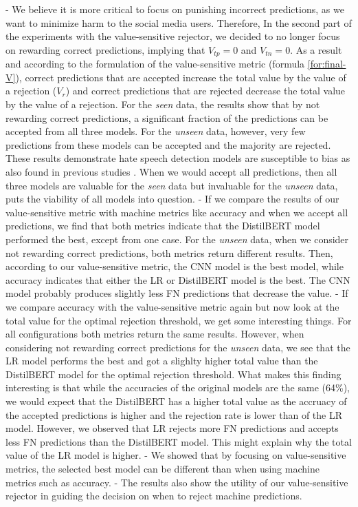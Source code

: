 - We believe it is more critical to focus on punishing incorrect predictions, as we want to minimize harm to the social media users. Therefore, In the second part of the experiments with the value-sensitive rejector, we decided to no longer focus on rewarding correct predictions, implying that $V_{tp}=0$ and $V_{tn}=0$. As a result and according to the formulation of the value-sensitive metric (formula \ref{for:final-V}), correct predictions that are accepted increase the total value by the value of a rejection ($V_r$) and correct predictions that are rejected decrease the total value by the value of a rejection. For the \emph{seen} data, the results show that by not rewarding correct predictions, a significant fraction of the predictions can be accepted from all three models. For the \emph{unseen} data, however, very few predictions from these models can be accepted and the majority are rejected. These results demonstrate hate speech detection models are susceptible to bias as also found in previous studies \citep{arango2019hate,grondahl2018all}. When we would accept all predictions, then all three models are valuable for the \emph{seen} data but invaluable for the \emph{unseen} data, puts the viability of all models into question.
- If we compare the results of our value-sensitive metric with machine metrics like accuracy and when we accept all predictions, we find that both metrics indicate that the DistilBERT model performed the best, except from one case. For the \emph{unseen} data, when we consider not rewarding correct predictions, both metrics return different results. Then, according to our value-sensitive metric, the CNN model is the best model, while accuracy indicates that either the LR or DistilBERT model is the best. The CNN model probably produces slightly less FN predictions that decrease the value.
- If we compare accuracy with the value-sensitive metric again but now look at the total value for the optimal rejection threshold, we get some interesting things. For all configurations both metrics return the same results. However, when considering not rewarding correct predictions for the \emph{unseen} data, we see that the LR model performs the best and got a slighlty higher total value than the DistilBERT model for the optimal rejection threshold. What makes this finding interesting is that while the accuracies of the original models are the same  (64\%), we would expect that the DistilBERT has a higher total value as the accruacy of the accepted predictions is higher and the rejection rate is lower than of the LR model. However, we observed that LR rejects more FN predictions and accepts less FN predictions than the DistilBERT model. This might explain why the total value of the LR model is higher.
- We showed that by focusing on value-sensitive metrics, the selected best model can be different than when using machine metrics such as accuracy.
- The results also show the utility of our value-sensitive rejector in guiding the decision on when to reject machine predictions.

